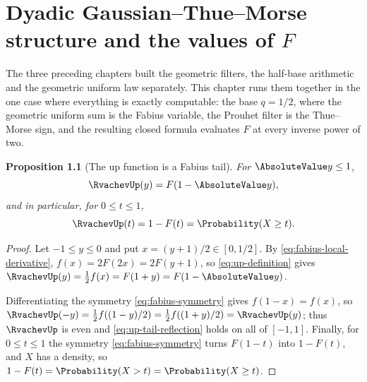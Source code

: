 \documentclass[11pt,a4paper,oneside,openany]{book}
\newtheorem{proposition}[proposition]{Proposition}
\theoremstyle{definition}
\theoremstyle{remark}
\begin{document}
\chapter{Dyadic Gaussian--Thue--Morse structure and the values of \texorpdfstring{$F$}{F}}
\label{chap:dyadic-gaussian-thue-morse}


The three preceding chapters built the geometric filters, the half-base
arithmetic and the geometric uniform law separately.  This chapter runs them
together in the one case where everything is exactly computable: the base
$q=1/2$, where the geometric uniform sum is the Fabius variable, the Prouhet
filter is the Thue--Morse sign, and the resulting closed formula evaluates
$F$ at every inverse power of two.


\begin{proposition}[The up function is a Fabius tail]\label{prop:up-tail}
For $\AbsoluteValue y\le1$,
\begin{equation}\label{eq:up-tail-reflection}
 \RvachevUp(y)=F(1-\AbsoluteValue y),
\end{equation}
and in particular, for $0\le t\le1$,
\begin{equation}\label{eq:up-survival}
 \RvachevUp(t)=1-F(t)=\Probability(X\ge t).
\end{equation}
\end{proposition}

\begin{proof}
Let $-1\le y\le0$ and put $x=(y+1)/2\in[0,1/2]$.  By
\eqref{eq:fabius-local-derivative}, $f(x)=2F(2x)=2F(y+1)$, so
\eqref{eq:up-definition} gives
$\RvachevUp(y)=\tfrac12f(x)=F(1+y)=F(1-\AbsoluteValue y)$.

Differentiating the symmetry \eqref{eq:fabius-symmetry} gives $f(1-x)=f(x)$, so
$\RvachevUp(-y)=\tfrac12f((1-y)/2)=\tfrac12f((1+y)/2)=\RvachevUp(y)$;
thus $\RvachevUp$ is even and \eqref{eq:up-tail-reflection} holds on all of
$[-1,1]$.  Finally, for $0\le t\le1$ the symmetry \eqref{eq:fabius-symmetry} turns
$F(1-t)$ into $1-F(t)$, and $X$ has a density, so
$1-F(t)=\Probability(X>t)=\Probability(X\ge t)$.
\end{proof}
\end{document}
